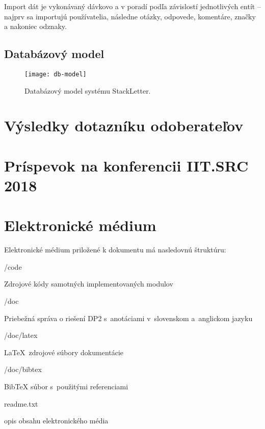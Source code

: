 Import dát je vykonávaný dávkovo a v poradí podľa závislostí jednotlivých entít -- najprv sa importujú používatelia,
následne otázky, odpovede, komentáre, značky a nakoniec odznaky.


\section{Databázový model}\label{apx:dbmodel}
\begin{figure}[H]\begin{center}
\texttt{[image: db-model]}
\caption{Databázový model systému StackLetter.\label{fig:db-model}}\end{center}
\end{figure}

\chapter{Výsledky dotazníku odoberateľov}
\label{appendix:survey}


\chapter{Príspevok na konferencii IIT.SRC 2018}




\chapter{Elektronické médium}

Elektronické médium priložené k dokumentu má nasledovnú štruktúru:
\begin{my_itemize}
\emptyitem /code
	\begin{my_itemize}
	\myitem Zdrojové kódy samotných implementovaných modulov
	\end{my_itemize}
\emptyitem /doc
	\begin{my_itemize}
	\myitem Priebežná správa o riešení DP2 s~anotáciami v~slovenskom a~anglickom jazyku
	\end{my_itemize}
\emptyitem /doc/latex
	\begin{my_itemize}
	\myitem \LaTeX~zdrojové súbory dokumentácie
	\end{my_itemize}
\emptyitem /doc/bibtex
	\begin{my_itemize}
	\myitem BibTeX súbor s~použitými referenciami
	\end{my_itemize}
\emptyitem readme.txt
  \begin{my_itemize}
  \myitem opis obsahu elektronického média
  \end{my_itemize}
\end{my_itemize}
